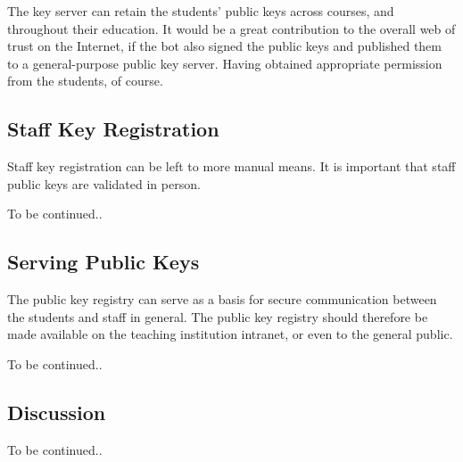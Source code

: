 The key server can retain the students' public keys across courses, and
throughout their education. It would be a great contribution to the overall web
of trust on the Internet, if the bot also signed the public keys and published
them to a general-purpose public key server. Having obtained appropriate
permission from the students, of course.

\subsection{Staff Key Registration}

Staff key registration can be left to more manual means. It is important that
staff public keys are validated in person.

To be continued..

\subsection{Serving Public Keys}

The public key registry can serve as a basis for secure communication between
the students and staff in general. The public key registry should therefore be
made available on the teaching institution intranet, or even to the general
public.

To be continued..

\subsection{Discussion}

To be continued..
